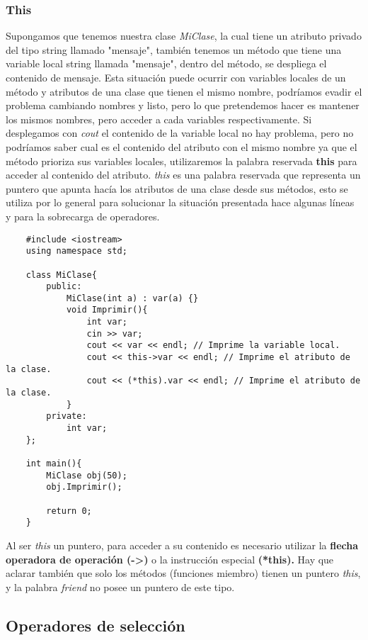 \subsubsection{This}

Supongamos que tenemos nuestra clase \textit{MiClase}, la cual tiene un atributo privado del tipo string llamado "mensaje", también tenemos un método que tiene una variable local string llamada "mensaje", dentro del método, se despliega el contenido de mensaje. Esta situación puede ocurrir con variables locales de un método y atributos de una clase que tienen el mismo nombre, podríamos evadir el problema cambiando nombres y listo, pero lo que pretendemos hacer es mantener los mismos nombres, pero acceder a cada variables respectivamente. Si desplegamos con \textit{cout} el contenido de la variable local no hay problema, pero no podríamos saber cual es el contenido del atributo con el mismo nombre ya que el método prioriza sus variables locales, utilizaremos la palabra reservada \textbf{this} para acceder al contenido del atributo. \textit{this} es una palabra reservada que representa un puntero que apunta hacía los atributos de una clase desde sus métodos, esto se utiliza por lo general para solucionar la situación presentada hace algunas líneas y para la sobrecarga de operadores.
\begin{lstlisting}
    #include <iostream>
    using namespace std;

    class MiClase{
        public:
            MiClase(int a) : var(a) {}
            void Imprimir(){
                int var;
                cin >> var;
                cout << var << endl; // Imprime la variable local.
                cout << this->var << endl; // Imprime el atributo de la clase.
                cout << (*this).var << endl; // Imprime el atributo de la clase.
            }
        private:
            int var;
    };
    
    int main(){
        MiClase obj(50);
        obj.Imprimir();
        
        return 0;
    }
\end{lstlisting}

Al ser \textit{this} un puntero, para acceder a su contenido es necesario utilizar la \textbf{flecha operadora de operación (->)} o la instrucción especial \textbf{(*this).} Hay que aclarar también que solo los métodos (funciones miembro) tienen un puntero \textit{this}, y la palabra \textit{friend} no posee un puntero de este tipo.


\subsection{Operadores de selección}

